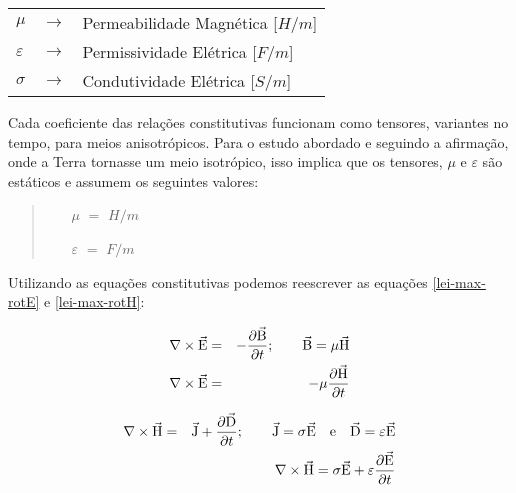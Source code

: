         {\footnotesize \noindent
            \begin{table}[H]
                \begin{tabular*}{1cm}{p{0.05cm}p{0.1cm}p{10cm}}
                    {\footnotesize $\mu$}          & {\footnotesize $\rightarrow$} & {\footnotesize Permeabilidade Magnética [$H/m$] }\\
                    {\footnotesize $\varepsilon$}  & {\footnotesize $\rightarrow$} & {\footnotesize Permissividade Elétrica [$F/m$] }\\
                    {\footnotesize $\sigma$}       & {\footnotesize $\rightarrow$} & {\footnotesize Condutividade Elétrica [$S/m$]} \\
                \end{tabular*}
            \end{table}}

        \noindent Cada coeficiente das relações constitutivas funcionam como tensores, variantes no tempo, para meios anisotrópicos. Para o estudo abordado e seguindo a afirmação, onde a Terra tornasse um meio isotrópico, isso implica que os tensores, $\mu$ e $\varepsilon$ são estáticos e assumem os seguintes valores:
        
        \begin{quote}
            \begin{enumerate}
                \item[$\mu$] $=$ $H/m$
                \item[$\varepsilon$] $=$ $F/m$
            \end{enumerate}
        \end{quote}
        
        Utilizando as equações constitutivas podemos reescrever as equações \ref{lei-max-rotE} e \ref{lei-max-rotH}:
        
        {\setlength\arraycolsep{2pt}
        \begin{eqnarray}
            \label{rotEconstH}
            \nabla \times \vec{\textrm{E}} &=& - \dfrac{\partial \vec{\textrm{B}}}{\partial t}; \qquad \vec{\textrm{B}} = \mu \vec{\textrm{H}} \nonumber \\
            \nabla \times \vec{\textrm{E}} &=& - \mu \dfrac{\partial \vec{\textrm{H}}}{\partial t}
        \end{eqnarray}}

        {\setlength\arraycolsep{2pt}
        \begin{eqnarray}
            \label{rotHconstE}
            \nabla \times \vec{\textrm{H}} &=& \vec{\textrm{J}} + \dfrac{\partial \vec{\textrm{D}}}{\partial t}; \qquad \vec{\textrm{J}} = \sigma \vec{\textrm{E}} \quad \textrm{e} \quad \vec{\textrm{D}} = \varepsilon \vec{\textrm{E}}\nonumber \\
            & &\nabla \times \vec{\textrm{H}} =  \sigma \vec{\textrm{E}} + \varepsilon \dfrac{\partial \vec{\textrm{E}}}{\partial t}
        \end{eqnarray}}
        

